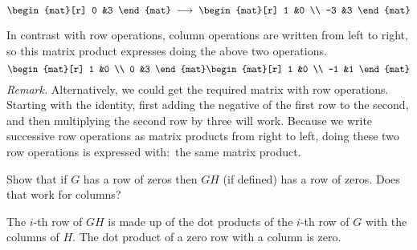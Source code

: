 \begin{exercises}
\begin{answer}
\begin{equation*}
\begin{mat}[r]
          0  &3
        \end{mat}
        \;\grstep{}\;
        \begin{mat}[r]
          1  &0  \\
          -3  &3
        \end{mat}
      \end{equation*}
      In contrast with row operations, column operations are written from
      left to right, so this matrix product expresses
      doing the above two operations.
      \begin{equation*}
        \begin{mat}[r]
          1  &0  \\
          0  &3
        \end{mat}
        \begin{mat}[r]
          1  &0  \\
         -1  &1
        \end{mat}
      \end{equation*}
      \textit{Remark.}
      Alternatively, we could get the required matrix with row operations.
      Starting with the identity, first adding the negative of the first 
      row to the  second, and then multiplying the second row by three
      will work.
      Because we write successive row operations as matrix products from
      right to left, doing these two row operations is expressed with:~the 
      same matrix product.    
    \end{answer}
  \recommended \item 
    Show that if \( G \) has a row of zeros then \( GH \)
    (if defined) has a row of zeros.
    Does that work for columns?
    \begin{answer}
      The \( i \)-th row of \( GH \) is made up of the dot products of
      the \( i \)-th row of \( G \) with the columns of \( H \).
      The dot product of a zero row with a column is zero.


\end{answer}
\end{exercises}
